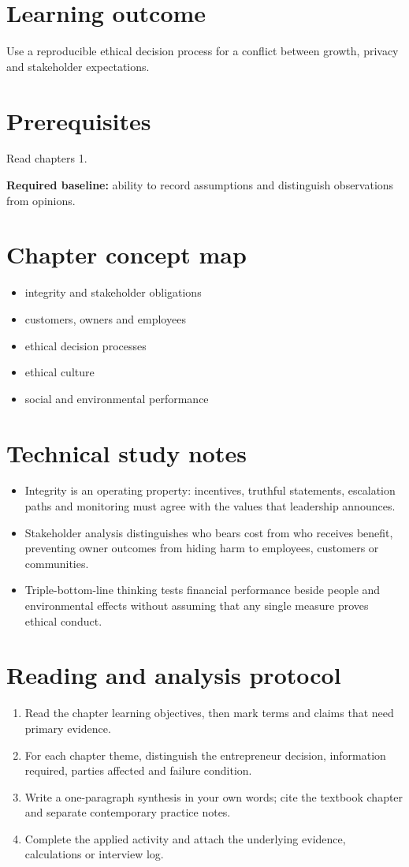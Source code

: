 \documentclass[11pt,letterpaper]{article}
\begin{document}
\SuiteOpen
\section{Learning outcome}
Use a reproducible ethical decision process for a conflict between growth, privacy and stakeholder expectations.
\section{Prerequisites}
Read chapters 1.\par\textbf{Required baseline:} ability to record assumptions and distinguish observations from opinions.
\section{Chapter concept map}
\begin{itemize}[leftmargin=*,itemsep=3pt]
\item integrity and stakeholder obligations
\item customers, owners and employees
\item ethical decision processes
\item ethical culture
\item social and environmental performance
\end{itemize}

\section{Technical study notes}
\begin{itemize}[leftmargin=*,itemsep=3pt]
\item Integrity is an operating property: incentives, truthful statements, escalation paths and monitoring must agree with the values that leadership announces.
\item Stakeholder analysis distinguishes who bears cost from who receives benefit, preventing owner outcomes from hiding harm to employees, customers or communities.
\item Triple-bottom-line thinking tests financial performance beside people and environmental effects without assuming that any single measure proves ethical conduct.
\end{itemize}

\section{Reading and analysis protocol}
\begin{enumerate}[leftmargin=*,itemsep=5pt]
\item Read the chapter learning objectives, then mark terms and claims that need primary evidence.
\item For each chapter theme, distinguish the entrepreneur decision, information required, parties affected and failure condition.
\item Write a one-paragraph synthesis in your own words; cite the textbook chapter and separate contemporary practice notes.
\item Complete the applied activity and attach the underlying evidence, calculations or interview log.
\end{enumerate}
\end{document}
